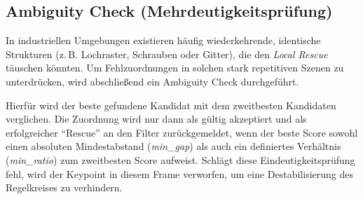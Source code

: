 \subsection{Ambiguity Check (Mehrdeutigkeitsprüfung)}
In industriellen Umgebungen existieren häufig wiederkehrende, identische Strukturen (z.\,B. Lochraster, Schrauben oder Gitter), die den \textit{Local Rescue} täuschen könnten. Um Fehlzuordnungen in solchen stark repetitiven Szenen zu unterdrücken, wird abschließend ein Ambiguity Check durchgeführt.

Hierfür wird der beste gefundene Kandidat mit dem zweitbesten Kandidaten verglichen. Die Zuordnung wird nur dann als gültig akzeptiert und als erfolgreicher \enquote{Rescue} an den Filter zurückgemeldet, wenn der beste Score sowohl einen absoluten Mindestabstand (\textit{min\_gap}) als auch ein definiertes Verhältnis (\textit{min\_ratio}) zum zweitbesten Score aufweist. Schlägt diese Eindeutigkeitsprüfung fehl, wird der Keypoint in diesem Frame verworfen, um eine Destabilisierung des Regelkreises zu verhindern.



